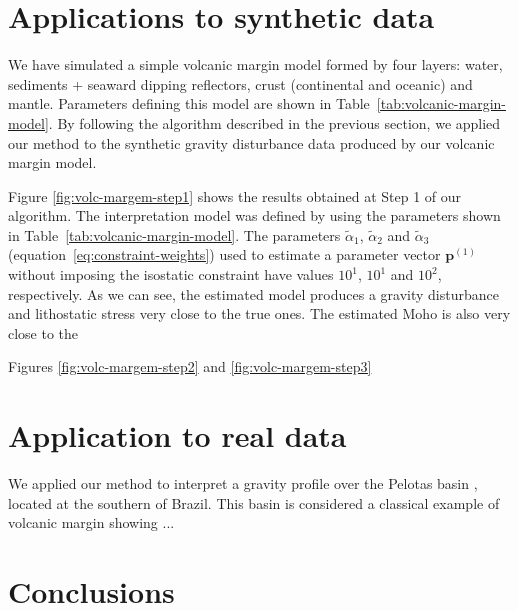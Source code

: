 \documentclass[manuscript]{geophysics}
\begin{document}
\section{Applications to synthetic data}


We have simulated a simple volcanic margin model formed by four layers: 
water, sediments + seaward dipping reflectors, crust (continental and oceanic) 
and mantle. 
Parameters defining this model are shown in Table~\ref{tab:volcanic-margin-model}.
By following the algorithm described in the previous section, we applied our method 
to the synthetic gravity disturbance data produced by our volcanic margin model.

Figure \ref{fig:volc-margem-step1} shows the results obtained at Step 1 of our
algorithm.
The interpretation model was defined by using the parameters shown in
Table~\ref{tab:volcanic-margin-model}.
The parameters $\tilde{\alpha}_{1}$, $\tilde{\alpha}_{2}$ and 
$\tilde{\alpha}_{3}$ (equation~\ref{eq:constraint-weights}) used to estimate a parameter 
vector $\mathbf{p}^{(1)}$ without imposing the isostatic constraint have values $10^{1}$, $10^{1}$ and $10^{2}$, respectively.
As we can see, the estimated model produces a gravity disturbance and 
lithostatic stress very close to the true ones.
The estimated Moho is also very close to the 




Figures \ref{fig:volc-margem-step2} and \ref{fig:volc-margem-step3} 



\section{Application to real data}

We applied our method to interpret a gravity profile over the Pelotas basin
\citep{stica-etal2014}, located at the southern of Brazil. This basin is considered
a classical example of volcanic margin \citep{geoffroy2005} showing ...


\section{Conclusions}

\lipsum[1-3]

\end{document}
